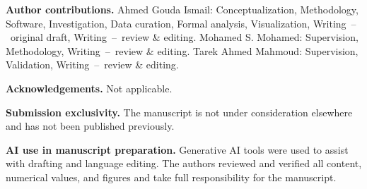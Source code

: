 \documentclass[pdflatex,sn-mathphys-num,iicol]{sn-jnl}
\begin{document}
\noindent\textbf{Author contributions.} Ahmed Gouda Ismail: Conceptualization, Methodology, Software, Investigation, Data curation, Formal analysis, Visualization, Writing~--~original draft, Writing~--~review \& editing. Mohamed S. Mohamed: Supervision, Methodology, Writing~--~review \& editing. Tarek Ahmed Mahmoud: Supervision, Validation, Writing~--~review \& editing.

\noindent\textbf{Acknowledgements.} Not applicable.

\noindent\textbf{Submission exclusivity.} The manuscript is not under consideration elsewhere and has not been published previously.

\noindent\textbf{AI use in manuscript preparation.} Generative AI tools were used to assist with drafting and language editing. The authors reviewed and verified all content, numerical values, and figures and take full responsibility for the manuscript.


\end{document}
